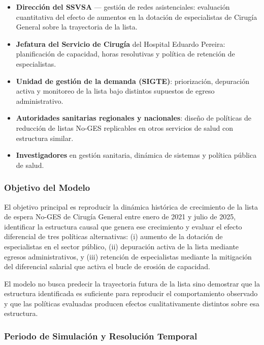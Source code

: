 \documentclass[12pt,a4paper]{article}
\begin{document}
\begin{itemize}[leftmargin=1.5cm]
  \item \textbf{Dirección del SSVSA} — gestión de redes asistenciales: evaluación cuantitativa del efecto de aumentos en la dotación de especialistas de Cirugía General sobre la trayectoria de la lista.
  \item \textbf{Jefatura del Servicio de Cirugía} del Hospital Eduardo Pereira: planificación de capacidad, horas resolutivas y política de retención de especialistas.
  \item \textbf{Unidad de gestión de la demanda (SIGTE)}: priorización, depuración activa y monitoreo de la lista bajo distintos supuestos de egreso administrativo.
  \item \textbf{Autoridades sanitarias regionales y nacionales}: diseño de políticas de reducción de listas No-GES replicables en otros servicios de salud con estructura similar.
  \item \textbf{Investigadores} en gestión sanitaria, dinámica de sistemas y política pública de salud.
\end{itemize}

\subsubsection*{Objetivo del Modelo}

El objetivo principal es reproducir la dinámica histórica de crecimiento de la lista de espera No-GES de Cirugía General entre enero de 2021 y julio de 2025, identificar la estructura causal que genera ese crecimiento y evaluar el efecto diferencial de tres políticas alternativas: (i) aumento de la dotación de especialistas en el sector público, (ii) depuración activa de la lista mediante egresos administrativos, y (iii) retención de especialistas mediante la mitigación del diferencial salarial que activa el bucle de erosión de capacidad.

El modelo no busca predecir la trayectoria futura de la lista sino demostrar que la estructura identificada es suficiente para reproducir el comportamiento observado y que las políticas evaluadas producen efectos cualitativamente distintos sobre esa estructura.

\subsubsection*{Periodo de Simulación y Resolución Temporal}
\end{document}
